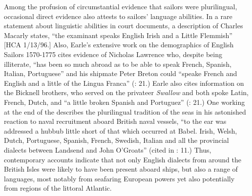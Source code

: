 Among the profusion of circumstantial evidence that sailors were plurilingual, occasional direct evidence also attests to sailors’ language abilities. In a rare statement about linguistic abilities in court documents, a description of Charles Macarly states, “the examinant speaks English Irish and a Little Flemmish” [HCA 1/13/96.] Also, Earle’s extensive work on the demographics of English  Sailors 1570-1775 cites evidence of Nicholas Lawrence who, despite being illiterate, “has been so much abroad as to be able to speak French, Spanish, Italian, Portuguese” and his shipmate Peter Breton could “speake French and English and a little of the Lingua Franca” (\citeyear*{Breton1998}: 21.) Earle also cites information on the Bicknell brothers, who served on the privateer \textit{Swallow} and both spoke Latin, French, Dutch, and “a little broken Spanish and Portuguez” (\citeyear*{Breton1998}: 21.) One  working at the end of the  describes the plurilingual tradition of the seas in his astonished reaction to naval recruitment aboard British naval vessels, “to the ear was addressed a hubbub little short of that which occurred at Babel. Irish, Welsh, Dutch, Portuguese, Spanish, French, Swedish, Italian and all the provincial dialects between Landsend and John O’Groats” (cited in \citealt{AdkinsAdkins2008}: 11.) Thus, contemporary accounts indicate that not only English dialects from around the British Isles were likely to have been present aboard ships, but also a range of languages, most notably from seafaring European powers yet also potentially from regions of the littoral Atlantic. 

